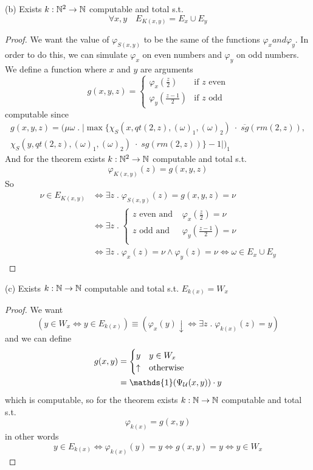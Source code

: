 (b) Exists $k:\mathbb{N}^2 \rightarrow \mathbb{N}$ computable and total s.t.
\[\forall x,y \quad E_{K(x,y)} = E_x \cup E_y\]
\begin{proof}
  We want the value of $\varphi_{S(x,y)}$ to be the same of the
  functions $\varphi_x and \varphi_y$. In order to do this, we can simulate
  $\varphi_x$ on even numbers and $\varphi_y$ on odd numbers. We
  define a function where $x$ and $y$ are arguments
  \[
    g(x,y,z) = \begin{cases}
      \varphi_x(\frac{z}{2}) & \mbox{if } z \mbox{ even} \\
      \varphi_y(\frac{z-1}{2}) & \mbox{if } z \mbox{ odd}
    \end{cases}
  \]
  computable since
  \begin{multline*}
    g(x,y,z) = (\mu \omega \; . \; |\max\{\chi_S(x,qt(2,z),(\omega)_1,(\omega)_2) \; \cdot \; \overline{sg}(rm(2,z)), \\ \chi_S(y,qt(2,z),(\omega)_1, (\omega)_2) \; \cdot \; sg(rm(2,z))\}- 1|)_1
  \end{multline*}
  And for the \smn theorem exists $k: \mathbb{N}^2 \rightarrow \mathbb{N}$
  computable and total s.t. \[\varphi_{K(x,y)}(z) = g(x,y,z)\]
  So
  \[
    \begin{split}
      \nu \in E_{K(x,y)} & \Leftrightarrow \exists z \; . \; \varphi_{S(x,y)}(z) = g(x,y,z) = \nu \\
      & \Leftrightarrow \exists z \; . \; \begin{cases}
        z \mbox{ even and } & \varphi_x(\frac{z}{2}) = \nu \\
        z \mbox{ odd and } & \varphi_y(\frac{z-1}{2}) = \nu \\
      \end{cases} \\
      & \Leftrightarrow \exists z \; . \; \varphi_x(z) = \nu \wedge
      \varphi_y(z) = \nu \Leftrightarrow \omega \in E_x \cup E_y
    \end{split}
  \]
\end{proof}

(c) Exists $k : \mathbb{N} \rightarrow \mathbb{N}$ computable and total s.t. $E_{k(x)} = W_x$
\begin{proof}
  We want
  \[(y \in W_x \Leftrightarrow y \in E_{k(x)}) \equiv
    (\varphi_x(y)\downarrow \Leftrightarrow \exists z \; . \;
    \varphi_{k(x)}(z) = y) \]
  and we can define
  \[
    \begin{split}
      g(x,y) &= \begin{cases}
        y & y \in W_x \\
        \uparrow & \mbox{otherwise}
      \end{cases} \\
      &= \mathds{1}( \univ (x,y)) \cdot y
    \end{split}
  \]
  which is computable, so for the \smn theorem exists $k : \mathbb{N} \rightarrow \mathbb{N}$
  computable and total s.t. \[\varphi_{k(x)} = g(x,y)\]
  in other words
  \[y \in E_{k(x)} \Leftrightarrow \varphi_{k(x)}(y) = y
    \Leftrightarrow g(x,y) = y  \Leftrightarrow y \in W_x\]
\end{proof}

